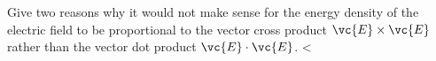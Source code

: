 Give two reasons why it would not make sense for the energy density of
the electric field to be proportional to the vector cross product
$\vc{E}\times\vc{E}$ rather
than the vector dot product $\vc{E}\cdot\vc{E}$.
<%
